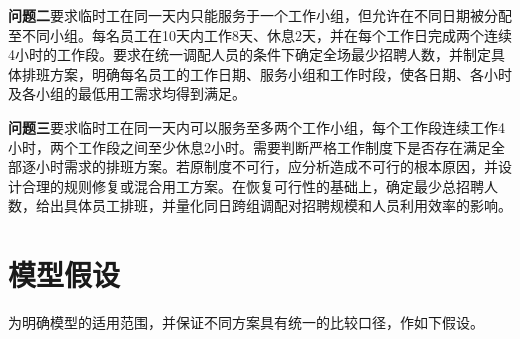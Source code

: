 \documentclass[withoutpreface,bwprint]{cumcmthesis}
\begin{document}
\textbf{问题二}要求临时工在同一天内只能服务于一个工作小组，但允许在不同日期被分配至不同小组。每名员工在10天内工作8天、休息2天，并在每个工作日完成两个连续4小时的工作段。要求在统一调配人员的条件下确定全场最少招聘人数，并制定具体排班方案，明确每名员工的工作日期、服务小组和工作时段，使各日期、各小时及各小组的最低用工需求均得到满足。

\textbf{问题三}要求临时工在同一天内可以服务至多两个工作小组，每个工作段连续工作4小时，两个工作段之间至少休息2小时。需要判断严格工作制度下是否存在满足全部逐小时需求的排班方案。若原制度不可行，应分析造成不可行的根本原因，并设计合理的规则修复或混合用工方案。在恢复可行性的基础上，确定最少总招聘人数，给出具体员工排班，并量化同日跨组调配对招聘规模和人员利用效率的影响。


\section{模型假设}

为明确模型的适用范围，并保证不同方案具有统一的比较口径，作如下假设。
\end{document}
